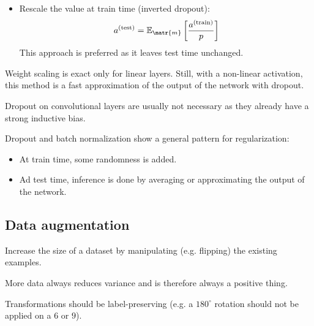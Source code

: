 \begin{description}
\begin{description}
\begin{itemize}
                    \item Rescale the value at train time (inverted dropout):
                        \[ a^\text{(test)} = \mathbb{E}_\matr{m} \left[ \frac{a^\text{(train)}}{p} \right] \]
                        This approach is preferred as it leaves test time unchanged.
                \end{itemize}

                \begin{remark}
                    Weight scaling is exact only for linear layers. Still, with a non-linear activation, this method is a fast approximation of the output of the network with dropout.
                \end{remark}
        \end{description}
\end{description}

\begin{remark}
    Dropout on convolutional layers are usually not necessary as they already have a strong inductive bias.
\end{remark}

\begin{remark}
    Dropout and batch normalization show a general pattern for regularization:
    \begin{itemize}
        \item At train time, some randomness is added.
        \item Ad test time, inference is done by averaging or approximating the output of the network.
    \end{itemize}
\end{remark}


\subsection{Data augmentation}

Increase the size of a dataset by manipulating (e.g. flipping) the existing examples.

\begin{remark}
    More data always reduces variance and is therefore always a positive thing.
\end{remark}

\begin{remark}
    Transformations should be label-preserving (e.g. a $180^\circ$ rotation should not be applied on a $6$ or $9$).
\end{remark}


